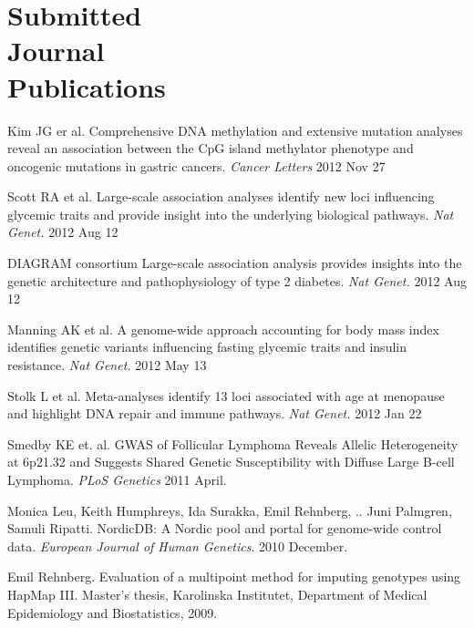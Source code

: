 %
%
\section{Submitted\\Journal\\Publications} \begin{bibsection}
\item Kim JG er al.
	Comprehensive DNA methylation and extensive mutation analyses reveal an association between the CpG island methylator phenotype and oncogenic mutations in gastric cancers.
	\emph{Cancer Letters} 2012 Nov 27
\item Scott RA et al.
	Large-scale association analyses identify new loci influencing glycemic traits and provide insight into the underlying biological pathways.
	\emph{Nat Genet.} 2012 Aug 12
    \item DIAGRAM consortium
	Large-scale association analysis provides insights into the genetic architecture and pathophysiology of type 2 diabetes.
	\emph{Nat Genet.} 2012 Aug 12
    \item Manning AK et al.
	A genome-wide approach accounting for body mass index identifies genetic variants influencing fasting glycemic traits and insulin resistance.
	\emph{Nat Genet.} 2012 May 13
    \item Stolk L et al.
	Meta-analyses identify 13 loci associated with age at menopause and highlight DNA repair and immune pathways.
	\emph{Nat Genet.} 2012 Jan 22
    \item Smedby KE et. al.
	GWAS of Follicular Lymphoma Reveals Allelic Heterogeneity at 6p21.32 and Suggests Shared Genetic Susceptibility with Diffuse Large B-cell Lymphoma.
	\emph{PLoS Genetics} 2011 April. 
    \item Monica Leu, Keith Humphreys, Ida Surakka, Emil Rehnberg, .. Juni Palmgren, Samuli Ripatti. 
	NordicDB: A Nordic pool and portal for genome-wide control data. 
	\emph{European Journal of Human Genetics}. 2010 December.
    \item Emil Rehnberg. 
	Evaluation of a multipoint method for imputing genotypes using HapMap III.
	Master’s thesis, Karolinska Institutet, Department of Medical Epidemiology and Biostatistics, 2009.
\end{bibsection}

%
%

